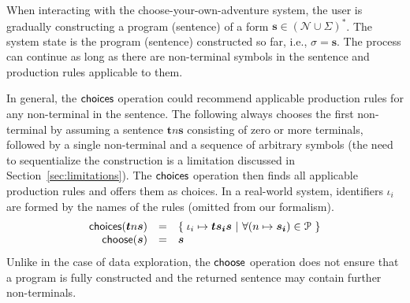 \documentclass[ a4paper,UKenglish,cleveref, autoref, thm-restate]{lipics-v2021}
\newcommand{\ident}[1]{\textsf{#1}}
\newcommand{\select}{\textnormal{\ident{choose}}}
\newcommand{\choices}{\textnormal{\ident{choices}}}
\begin{document}
When interacting with the choose-your-own-adventure system, the user is gradually constructing a
program (sentence) of a form $\boldsymbol{s}\in(\mathcal{N}\cup\Sigma)^{*}$. The system state is the program (sentence)
constructed so far, i.e., $\sigma = \boldsymbol{s}$. The process can continue
as long as there are non-terminal symbols in the sentence and production rules applicable to them.

In general, the $\choices$ operation could recommend applicable production rules for any
non-terminal in the sentence. The following always chooses the first non-terminal by assuming
a sentence $\boldsymbol{t}n\boldsymbol{s}$ consisting of zero or more terminals, followed by a
single non-terminal and a sequence of arbitrary symbols (the need to sequentialize the construction
is a limitation discussed in Section~\ref{sec:limitations}). The $\choices$ operation then finds
all applicable production rules and offers them as choices. In a real-world system, identifiers
$\iota_i$ are formed by the names of the rules (omitted from our formalism).
\[
\begin{array}{rcl}
\choices(\boldsymbol{t}n\boldsymbol{s}) &=& \{\; \iota_i \mapsto \boldsymbol{t}\boldsymbol{s_i}\boldsymbol{s} ~|~ \forall (n\mapsto\boldsymbol{s_i})\in \mathcal{P} ~\}\\
\select(\boldsymbol{s}) &=& \boldsymbol{s}
\end{array}
\]
Unlike in the case of data exploration, the $\select$ operation does not ensure
that a program is fully constructed and the returned sentence may contain further non-terminals.
\end{document}
